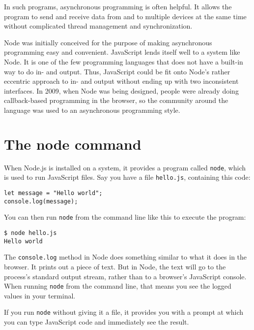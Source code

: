In such programs, asynchronous programming is often helpful. It allows the program to send and receive data from and to multiple devices at the same time without complicated thread management and synchronization.

Node was initially conceived for the purpose of making asynchronous programming easy and convenient. JavaScript lends itself well to a system like Node. It is one of the few programming languages that does not have a built-in way to do in- and output. Thus, JavaScript could be fit onto Node's rather eccentric approach to in- and output without ending up with two inconsistent interfaces. In 2009, when Node was being designed, people were already doing callback-based programming in the browser, so the community around the language was used to an asynchronous programming style.

\section{The node command}

When Node.js is installed on a system, it provides a program called \lstinline`node`, which is used to run JavaScript files. Say you have a file \lstinline`hello.js`, containing this code:

\begin{lstlisting}
let message = "Hello world";
console.log(message);
\end{lstlisting}
\noindent

You can then run \lstinline`node` from the command line like this to execute the program:

\begin{lstlisting}
$ node hello.js
Hello world
\end{lstlisting}
\noindent{}

The \lstinline`console.log` method in Node does something similar to what it does in the browser. It prints out a piece of text. But in Node, the text will go to the process's standard output stream, rather than to a browser's JavaScript console. When running \lstinline`node` from the command line, that means you see the logged values in your terminal.

If you run \lstinline`node` without giving it a file, it provides you with a prompt at which you can type JavaScript code and immediately see the result.

